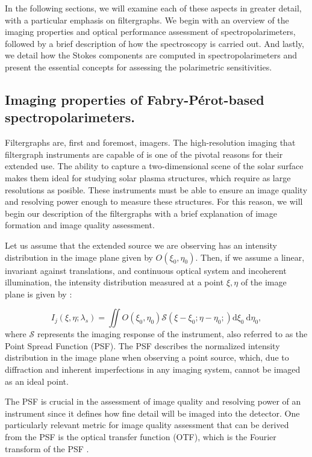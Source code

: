 In the following sections, we will examine each of these aspects in greater detail, with a particular emphasis on filtergraphs. We begin with an overview of the imaging properties and optical performance assessment of spectropolarimeters, followed by a brief description of how the spectroscopy is carried out. And lastly, we detail how the Stokes components are computed in spectropolarimeters and present the essential concepts for assessing the polarimetric sensitivities. 


\subsection{Imaging properties of Fabry-Pérot-based spectropolarimeters.\label{sec: intro-imaging}}

Filtergraphs are, first and foremost, imagers. The high-resolution imaging that filtergraph instruments are capable of is one of the pivotal reasons for their extended use. The ability to capture a two-dimensional scene of the solar surface makes them ideal for studying solar plasma structures, which require as large resolutions as posible. These instruments must be able to ensure an image quality and resolving power enough to measure these structures. For this reason, we will begin our description of the filtergraphs with a brief explanation of image formation and image quality assessment. 

Let us assume that the extended source we are observing has an intensity distribution in the image plane given by $O(\xi _ 0, \eta _ 0)$. Then, if we assume a linear, invariant against translations, and continuous optical system and incoherent illumination, the intensity distribution measured at a point $\xi, \eta$ of the image plane is given by : 

\begin{equation}
  I_ j\left(\xi, \eta ; \lambda_{s}\right)= \iint  O\left(\xi_0, \eta_0\right)  \mathcal{S}\left(\xi-\xi_0; \eta-\eta_0;\right)  \mathrm{d} \xi_{0} \mathrm{~d} \eta_{0},
  \label{eq_imaging: intensity_simple}
\end{equation}
where $\mathcal{S}$ represents the imaging response of the instrument, also referred to as the Point Spread Function (PSF). The PSF describes the normalized intensity distribution in the image plane when observing a point source, which, due to diffraction and inherent imperfections in any imaging system, cannot be imaged as an ideal point.

The PSF is crucial in the assessment of image quality and resolving power of an instrument since it defines how fine detail will be imaged into the detector. One particularly relevant metric for image quality assessment that can be derived from the PSF is the optical transfer function (OTF), which is the Fourier transform of the PSF \citep{vargas_tesis}. 

